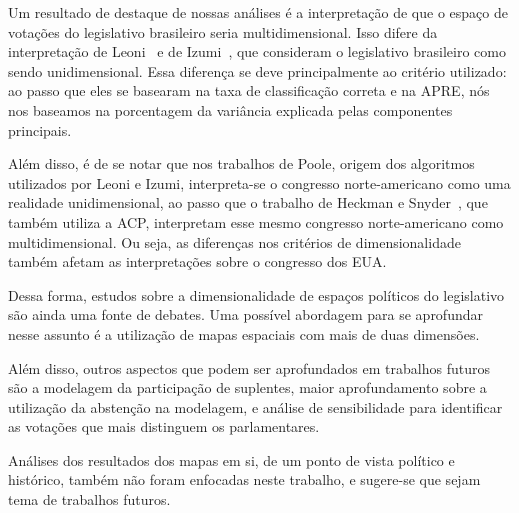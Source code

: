 \documentclass[
	article,			%
	12pt,				%
	oneside,			%
	a4paper,			%
	english,			%
	brazil,				%
	sumario=tradicional,
	oldfontcommands %
	]{abntex2}
\begin{document}
Um resultado de destaque de nossas análises é a interpretação de que o espaço de votações do legislativo brasileiro seria multidimensional. Isso difere da interpretação de Leoni~\cite{leoni02cdep} e de Izumi~\cite{izumi2016senado}, que consideram o legislativo brasileiro como sendo unidimensional. Essa diferença se deve principalmente ao critério utilizado: ao passo que eles se basearam na taxa de classificação correta e na APRE, nós nos baseamos na porcentagem da variância explicada pelas componentes principais. 

Além disso, é de se notar que nos trabalhos de Poole, origem dos algoritmos utilizados por Leoni e Izumi, interpreta-se o congresso norte-americano como uma realidade unidimensional, ao passo que o trabalho de Heckman e Snyder~\cite{heckman-snyder1997}, que também utiliza a ACP, interpretam esse mesmo congresso norte-americano como multidimensional. Ou seja, as diferenças nos critérios de dimensionalidade também afetam as interpretações sobre o congresso dos EUA.

Dessa forma, estudos sobre a dimensionalidade de espaços políticos do legislativo são ainda uma fonte de debates. Uma possível abordagem para se aprofundar nesse assunto é a utilização de mapas espaciais com mais de duas dimensões.

Além disso, outros aspectos que podem ser aprofundados em trabalhos futuros são a modelagem da participação de suplentes, maior aprofundamento sobre a utilização da abstenção na modelagem, e análise de sensibilidade para identificar as votações que mais distinguem os parlamentares. 

Análises dos resultados dos mapas em si, de um ponto de vista político e histórico, também não foram enfocadas neste trabalho, e sugere-se que sejam tema de trabalhos futuros.


{}
 
\end{document}
